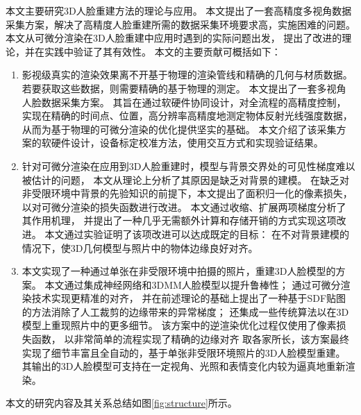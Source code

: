 本文主要研究3D人脸重建方法的理论与应用。
本文提出了一套高精度多视角数据采集方案，解决了高精度人脸重建所需的数据采集环境要求高，实施困难的问题。
本文从可微分渲染在3D人脸重建中应用时遇到的实际问题出发，
提出了改进的理论，并在实践中验证了其有效性。
本文的主要贡献可概括如下：

\begin{enumerate}
\item 影视级真实的渲染效果离不开基于物理的渲染管线和精确的几何与材质数据。
若要获取这些数据，则需要精确的基于物理的测定。
本文提出了一套多视角人脸数据采集方案。
其旨在通过软硬件协同设计，对全流程的高精度控制，实现在精确的时间点、位置，高分辨率高精度地测定物体反射光线强度数据，
从而为基于物理的可微分渲染的优化提供坚实的基础。
本文介绍了该采集方案的软硬件设计，设备标定校准方法，使用交互方式和实现验证结果。

\item 针对可微分渲染在应用到3D人脸重建时，模型与背景交界处的可见性梯度难以被估计的问题，
本文从理论上分析了其原因是缺乏对背景的建模。
在缺乏对非受限环境中背景的先验知识的前提下，本文提出了面积归一化的像素损失，
以对可微分渲染的损失函数进行改进。
本文通过收缩、扩展两项梯度分析了其作用机理，
并提出了一种几乎无需额外计算和存储开销的方式实现这项改进。
本文通过实验证明了该项改进可以达成既定的目标：
在不对背景建模的情况下，使3D几何模型与照片中的物体边缘良好对齐。

\item 本文实现了一种通过单张在非受限环境中拍摄的照片，重建3D人脸模型的方案。
本文通过集成神经网络和3DMM人脸模型以提升鲁棒性；
通过可微分渲染技术实现更精准的对齐，
并在前述理论的基础上提出了一种基于SDF贴图的方法消除了人工裁剪的边缘带来的异常梯度；
还集成一些传统算法以在3D模型上重现照片中的更多细节。
该方案中的逆渲染优化过程仅使用了像素损失函数，
以非常简单的流程实现了精确的边缘对齐
取各家所长，该方案最终实现了细节丰富且全自动的，基于单张非受限环境照片的3D人脸模型重建。
其输出的3D人脸模型可支持在一定视角、光照和表情变化内较为逼真地重新渲染。

\end{enumerate}
本文的研究内容及其关系总结如图\ref{fig:structure}所示。


